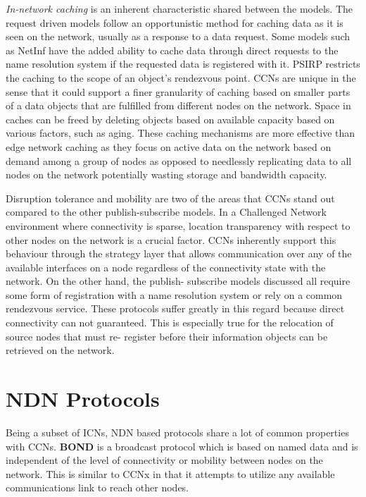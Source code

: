 \documentclass[a4paper,12pt]{report}      %
\begin{document}
\emph{In-network caching} is an inherent characteristic shared between the models. The request driven models
follow an opportunistic method for caching data as it is seen on the network, usually as a response to a
data request. Some models such as NetInf have the added ability to cache data through direct requests
to the name resolution system if the requested data is registered with it. PSIRP restricts the caching to
the scope of an object's rendezvous point. CCNs are unique in the sense that it could support a finer granularity of caching based on smaller parts of a data objects that are fulfilled from different nodes on
the network. Space in caches can be freed by deleting objects based on available capacity based on
various factors, such as aging. These caching mechanisms are more effective than edge network
caching as they focus on active data on the network based on demand among a group of nodes as
opposed to needlessly replicating data to all nodes on the network potentially wasting storage and
bandwidth capacity.

Disruption tolerance and mobility are two of the areas that CCNs stand out compared to the other
publish-subscribe models. In a Challenged Network environment where connectivity is sparse, location
transparency with respect to other nodes on the network is a crucial factor. CCNs inherently support
this behaviour through the strategy layer that allows communication over any of the available interfaces
on a node regardless of the connectivity state with the network. On the other hand, the publish-
subscribe models discussed all require some form of registration with a name resolution system or rely
on a common rendezvous service. These protocols suffer greatly in this regard because direct
connectivity can not guaranteed. This is especially true for the relocation of source nodes that must re-
register before their information objects can be retrieved on the network\cite{dirk2941}.

\section{NDN Protocols}

Being a subset of ICNs, NDN based protocols share a lot of common properties with CCNs.
\textbf{BOND} \cite{bond} is a broadcast protocol which is based on named data and is independent of the
level of connectivity or mobility between nodes on the network. This is similar to CCNx in that it
attempts to utilize any available communications link to reach other nodes.
\end{document}
